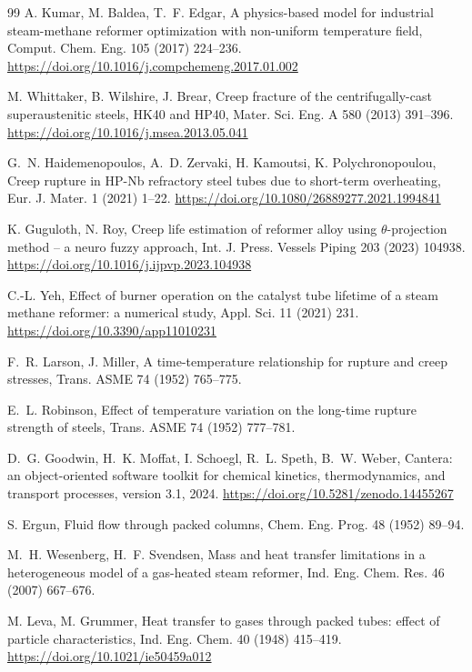 \documentclass[final,3p,times]{elsarticle}
\begin{document}
\begin{thebibliography}{99}
 A. Kumar, M. Baldea, T.~F. Edgar, A physics-based model for industrial steam-methane reformer optimization with non-uniform temperature field, Comput. Chem. Eng. 105 (2017) 224--236. \url{https://doi.org/10.1016/j.compchemeng.2017.01.002}

 M. Whittaker, B. Wilshire, J. Brear, Creep fracture of the centrifugally-cast superaustenitic steels, HK40 and HP40, Mater. Sci. Eng. A 580 (2013) 391--396. \url{https://doi.org/10.1016/j.msea.2013.05.041}

 G.~N. Haidemenopoulos, A.~D. Zervaki, H. Kamoutsi, K. Polychronopoulou, Creep rupture in HP-Nb refractory steel tubes due to short-term overheating, Eur. J. Mater. 1 (2021) 1--22. \url{https://doi.org/10.1080/26889277.2021.1994841}

 K. Guguloth, N. Roy, Creep life estimation of reformer alloy using $\theta$-projection method -- a neuro fuzzy approach, Int. J. Press. Vessels Piping 203 (2023) 104938. \url{https://doi.org/10.1016/j.ijpvp.2023.104938}

 C.-L. Yeh, Effect of burner operation on the catalyst tube lifetime of a steam methane reformer: a numerical study, Appl. Sci. 11 (2021) 231. \url{https://doi.org/10.3390/app11010231}

 F.~R. Larson, J. Miller, A time-temperature relationship for rupture and creep stresses, Trans. ASME 74 (1952) 765--775.

 E.~L. Robinson, Effect of temperature variation on the long-time rupture strength of steels, Trans. ASME 74 (1952) 777--781.

 D.~G. Goodwin, H.~K. Moffat, I. Schoegl, R.~L. Speth, B.~W. Weber, Cantera: an object-oriented software toolkit for chemical kinetics, thermodynamics, and transport processes, version 3.1, 2024. \url{https://doi.org/10.5281/zenodo.14455267}

 S. Ergun, Fluid flow through packed columns, Chem. Eng. Prog. 48 (1952) 89--94.

 M.~H. Wesenberg, H.~F. Svendsen, Mass and heat transfer limitations in a heterogeneous model of a gas-heated steam reformer, Ind. Eng. Chem. Res. 46 (2007) 667--676.

 M. Leva, M. Grummer, Heat transfer to gases through packed tubes: effect of particle characteristics, Ind. Eng. Chem. 40 (1948) 415--419. \url{https://doi.org/10.1021/ie50459a012}


\end{thebibliography}
\end{document}
